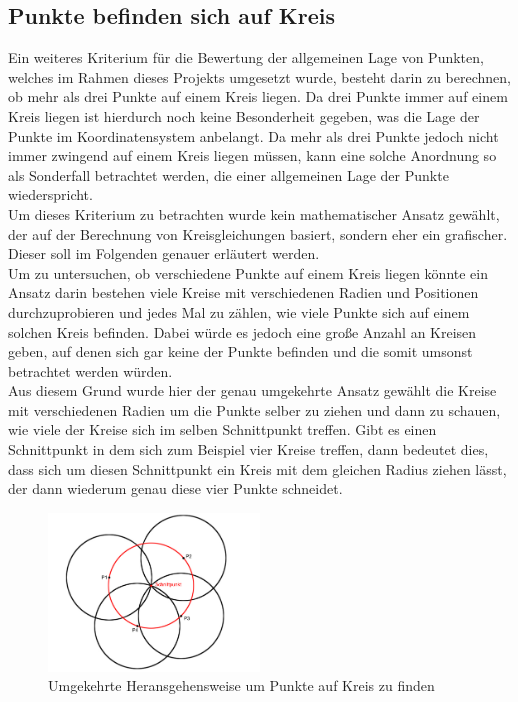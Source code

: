 \documentclass[a4paper,twocolumn]{scrartcl}
\begin{document}
\subsection{Punkte befinden sich auf Kreis}
Ein weiteres Kriterium für die Bewertung der allgemeinen Lage von Punkten, welches im Rahmen dieses Projekts umgesetzt wurde, besteht darin zu berechnen, ob mehr als drei Punkte auf einem Kreis liegen. Da drei Punkte immer auf einem Kreis liegen ist hierdurch noch keine Besonderheit gegeben, was die Lage der Punkte im Koordinatensystem anbelangt. Da mehr als drei Punkte jedoch nicht immer zwingend auf einem Kreis liegen müssen, kann eine solche Anordnung so als Sonderfall betrachtet werden, die einer allgemeinen Lage der Punkte wiederspricht.\\
Um dieses Kriterium zu betrachten wurde kein mathematischer Ansatz gewählt, der auf der Berechnung von Kreisgleichungen basiert, sondern eher ein grafischer. Dieser soll im Folgenden genauer erläutert werden.\\
Um zu untersuchen, ob verschiedene Punkte auf einem Kreis liegen könnte ein Ansatz darin bestehen viele Kreise mit verschiedenen Radien und Positionen durchzuprobieren und jedes Mal zu zählen, wie viele Punkte sich auf einem solchen Kreis befinden. Dabei würde es jedoch eine große Anzahl an Kreisen geben, auf denen sich gar keine der Punkte befinden und die somit umsonst betrachtet werden würden.\\
Aus diesem Grund wurde hier der genau umgekehrte Ansatz gewählt die Kreise mit verschiedenen Radien um die Punkte selber zu ziehen und dann zu schauen, wie viele der Kreise sich im selben Schnittpunkt treffen. Gibt es einen Schnittpunkt in dem sich zum Beispiel vier Kreise treffen, dann bedeutet dies, dass sich um diesen Schnittpunkt ein Kreis mit dem gleichen Radius ziehen lässt, der dann wiederum genau diese vier Punkte schneidet.
 
\begin{figure}[h]
\centering
\includegraphics[width=0.5\textwidth]{Bilder/kreise}
\caption{Umgekehrte Heransgehensweise um Punkte auf Kreis zu finden}
\label{img:kreise}
\end{figure}
\end{document}
